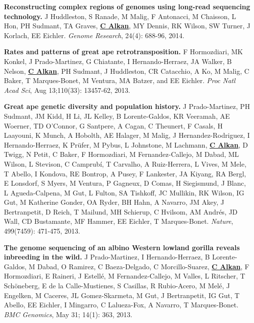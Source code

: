  \vspace{-.2cm}        
        {\bf Reconstructing complex regions of genomes using long-read sequencing technology.}
         J Huddleston, S Ranade, M Malig, F Antonacci, M Chaisson, L Hon, PH Sudmant, TA Graves, 
         {\bf {\underline{C Alkan}}}, MY Dennis, RK Wilson, SW Turner, J Korlach, EE Eichler. 
         {\em Genome Research},  24(4): 688-96, 2014.


 \vspace{-.2cm}        
        {\bf Rates and patterns of great ape retrotransposition.}
        F Hormozdiari, MK Konkel, J Prado-Martinez, G Chiatante, I Hernando-Herraez, JA Walker, B Nelson, {\bf {\underline {C Alkan}}}, PH Sudmant, J Huddleston, CR Catacchio, A Ko, 
        M Malig, C Baker, T Marques-Bonet, M Ventura, MA Batzer, and EE Eichler. 
        {\em Proc Natl Acad Sci}, Aug 13;110(33): 13457-62, 2013.
                             

 \vspace{-.2cm}
        {\bf Great ape genetic diversity and population history.}
        J Prado-Martinez, PH Sudmant, JM Kidd, H Li, JL Kelley, B Lorente-Galdos, KR Veeramah, AE Woerner, TD O’Connor, G Santpere, A Cagan, C Theunert, F Casals, H Laayouni, K Munch, A Hobolth, AE Halager, M Malig, J Hernandez-Rodriguez, I Hernando-Herraez, K Prüfer, M Pybus, L Johnstone, M Lachmann, {\bf {\underline {C Alkan}}}, D Twigg, N Petit, C Baker, F Hormozdiari, M Fernandez-Callejo, M Dabad, ML Wilson, L Stevison, C Camprubí, T Carvalho, A Ruiz-Herrera, L Vives, M Mele, T Abello, I Kondova, RE Bontrop, A Pusey, F Lankester, JA Kiyang, RA Bergl, E Lonsdorf, S Myers, M Ventura, P Gagneux, D Comas, H Siegismund, J Blanc, L Agueda-Calpena, M Gut, L Fulton, SA Tishkoff, JC Mullikin, RK Wilson, IG Gut, M Katherine Gonder, OA Ryder, BH Hahn, A Navarro, JM Akey, J Bertranpetit, D Reich, T Mailund, MH Schierup, C Hvilsom, AM Andrés, JD Wall, CD Bustamante, MF Hammer, EE Eichler, T Marques-Bonet. 
        {\em Nature}, 499(7459): 471-475, 2013.

        

\vspace{-.2cm}
        {\bf The genome sequencing of an albino Western lowland gorilla reveals inbreeding in the wild.}
        J Prado-Martinez, I Hernando-Herraez, B Lorente-Galdos, M Dabad, O Ramirez, C Baeza-Delgado, C Morcillo-Suarez, 
        {\bf {\underline {C Alkan}}}, F Hormozdiari, E Raineri, J Estellé, M Fernandez-Callejo, M Valles, L Ritscher, T Schöneberg, E de la Calle-Mustienes, 
        S Casillas, R Rubio-Acero, M Melé, J Engelken, M Caceres, JL Gomez-Skarmeta, M Gut, J Bertranpetit, IG Gut, T Abello, 
        EE Eichler, I Mingarro, C Lalueza-Fox, A Navarro, T Marques-Bonet.
        {\em BMC Genomics}, May 31; 14(1): 363, 2013.

